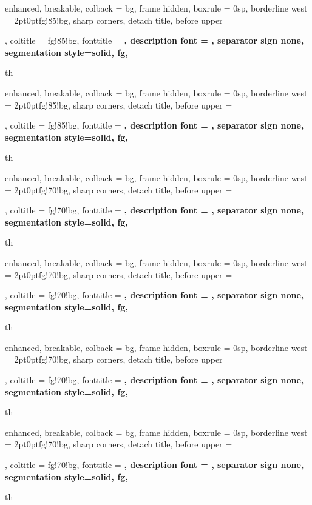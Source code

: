 {%
	enhanced,
	breakable,
	colback = bg,
	frame hidden,
	boxrule = 0sp,
	borderline west = {2pt}{0pt}{fg!85!bg},
	sharp corners,
	detach title,
	before upper = \tcbtitle\par\smallskip,
	coltitle = fg!85!bg,
	fonttitle = \bfseries\sffamily,
	description font = \mdseries,
	separator sign none,
	segmentation style={solid, fg},
}
{th}
{%
	enhanced,
	breakable,
	colback = bg,
	frame hidden,
	boxrule = 0sp,
	borderline west = {2pt}{0pt}{fg!85!bg},
	sharp corners,
	detach title,
	before upper = \tcbtitle\par\smallskip,
	coltitle = fg!85!bg,
	fonttitle = \bfseries\sffamily,
	description font = \mdseries,
	separator sign none,
	segmentation style={solid, fg},
}
{th}


{%
	enhanced,
	breakable,
	colback = bg,
	frame hidden,
	boxrule = 0sp,
	borderline west = {2pt}{0pt}{fg!70!bg},
	sharp corners,
	detach title,
	before upper = \tcbtitle\par\smallskip,
	coltitle = fg!70!bg,
	fonttitle = \bfseries\sffamily,
	description font = \mdseries,
	separator sign none,
	segmentation style={solid, fg},
}
{th}
{%
	enhanced,
	breakable,
	colback = bg,
	frame hidden,
	boxrule = 0sp,
	borderline west = {2pt}{0pt}{fg!70!bg},
	sharp corners,
	detach title,
	before upper = \tcbtitle\par\smallskip,
	coltitle = fg!70!bg,
	fonttitle = \bfseries\sffamily,
	description font = \mdseries,
	separator sign none,
	segmentation style={solid, fg},
}
{th}

{%
	enhanced,
	breakable,
	colback = bg,
	frame hidden,
	boxrule = 0sp,
	borderline west = {2pt}{0pt}{fg!70!bg},
	sharp corners,
	detach title,
	before upper = \tcbtitle\par\smallskip,
	coltitle = fg!70!bg,
	fonttitle = \bfseries\sffamily,
	description font = \mdseries,
	separator sign none,
	segmentation style={solid, fg},
}
{th}
{%
	enhanced,
	breakable,
	colback = bg,
	frame hidden,
	boxrule = 0sp,
	borderline west = {2pt}{0pt}{fg!70!bg},
	sharp corners,
	detach title,
	before upper = \tcbtitle\par\smallskip,
	coltitle = fg!70!bg,
	fonttitle = \bfseries\sffamily,
	description font = \mdseries,
	separator sign none,
	segmentation style={solid, fg},
}
{th}

